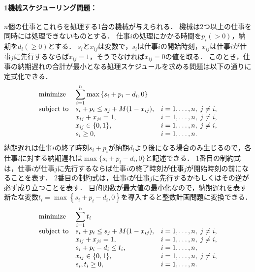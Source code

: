 \documentclass[japanese]{jnlp_1.4}
\begin{document}
\paragraph{1機械スケジューリング問題：}
$n$個の仕事とこれらを処理する1台の機械が与えられる．
機械は2つ以上の仕事を同時には処理できないものとする．
仕事$i$の処理にかかる時間を$p_i (> 0)$，納期を$d_i (\ge 0)$とする．
$s_i$と$x_{ij}$は変数で，$s_i$は仕事$i$の開始時刻，$x_{ij}$は仕事$i$が仕事$j$に先行するならば$x_{ij}=1$，そうでなければ$x_{ij}=0$の値を取る．
このとき，仕事の納期遅れの合計が最小となる処理スケジュールを求める問題は以下の通りに定式化できる．
\begin{equation}
\begin{array}{lll}
\textnormal{minimize} & \displaystyle\sum_{i=1}^n \max \left\{ s_i + p_i - d_i, 0 \right\} & \\
\textnormal{subject to} & s_i + p_i \le s_j + M(1 - x_{ij}), & i=1,\dots,n, \; j\not=i,\\
 & x_{ij} + x_{ji} = 1, & i=1,\dots,n, \; j\not=i,\\
 & x_{ij} \in \{ 0,1 \}, & i=1,\dots,n, \; j\not=i,\\
 & s_i \ge 0, & i=1,\dots,n.
\end{array}
\end{equation}
納期遅れは仕事$i$の終了時刻$s_i+p_i$が納期$d_i$より後になる場合のみ生じるので，各仕事$i$に対する納期遅れは$\max\{ s_i + p_i - d_i, 0 \}$と記述できる．
1番目の制約式は，仕事$i$が仕事$j$に先行するならば仕事$i$の終了時刻が仕事$j$が開始時刻の前になることを表す．
2番目の制約式は，仕事$i$が仕事$j$に先行するかもしくはその逆が必ず成り立つことを表す．
目的関数が最大値の最小化なので，納期遅れを表す新たな変数$t_i = \max \left\{ s_i + p_i - d_i, 0 \right\}$を導入すると整数計画問題に変換できる．
\begin{equation}
\begin{array}{lll}
\textnormal{minimize} & \displaystyle\sum_{i=1}^n t_i &\\
\textnormal{subject to} & s_i + p_i \le s_j + M(1 - x_{ij}), & i=1,\dots,n, \; j\not=i,\\
 & x_{ij} + x_{ji} = 1, & i=1,\dots,n, \; j\not=i,\\
 & s_i + p_i - d_i \le t_i, & i=1,\dots,n, \\
 & x_{ij} \in \{ 0,1 \}, & i=1,\dots,n, \; j\not=i,\\
 & s_i, t_i \ge 0, & i=1,\dots,n.
\end{array}
\end{equation}
\end{document}
